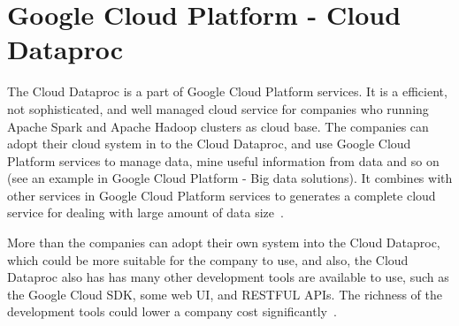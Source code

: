 \section{Google Cloud Platform - Cloud Dataproc}

The Cloud Dataproc is a part of Google Cloud Platform services. It is a efficient, not sophisticated, and well managed cloud service for companies who running Apache Spark and Apache Hadoop clusters as cloud base. The companies can adopt their cloud system in to the Cloud Dataproc, and use Google Cloud Platform services to manage data, mine useful information from data and so on (see an example in Google Cloud Platform - Big data solutions). It combines with other services in Google Cloud Platform services to generates a complete cloud service for dealing with large amount of data size~\cite{GoogleCP_CD}.

More than the companies can adopt their own system into the Cloud Dataproc, which could be more suitable for the company to use, and also, the Cloud Dataproc also has has many other development tools are available to use, such as the Google Cloud SDK, some web UI, and RESTFUL APIs. The richness of the development tools could lower a company cost significantly~\cite{GoogleCP_CD}.

